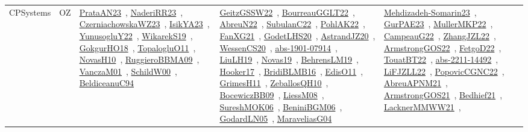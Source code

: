 {\begin{longtable}{lp{3cm}>{\raggedright\arraybackslash}p{6cm}>{\raggedright\arraybackslash}p{6cm}>{\raggedright\arraybackslash}p{8cm}}
CPSystems & OZ & \href{works/PrataAN23.pdf}{PrataAN23}~\cite{PrataAN23}, \href{works/NaderiRR23.pdf}{NaderiRR23}~\cite{NaderiRR23}, \href{works/CzerniachowskaWZ23.pdf}{CzerniachowskaWZ23}~\cite{CzerniachowskaWZ23}, \href{works/IsikYA23.pdf}{IsikYA23}~\cite{IsikYA23}, \href{works/YunusogluY22.pdf}{YunusogluY22}~\cite{YunusogluY22}, \href{works/WikarekS19.pdf}{WikarekS19}~\cite{WikarekS19}, \href{works/GokgurHO18.pdf}{GokgurHO18}~\cite{GokgurHO18}, \href{works/TopalogluO11.pdf}{TopalogluO11}~\cite{TopalogluO11}, \href{works/NovasH10.pdf}{NovasH10}~\cite{NovasH10}, \href{works/RuggieroBBMA09.pdf}{RuggieroBBMA09}~\cite{RuggieroBBMA09}, \href{works/VanczaM01.pdf}{VanczaM01}~\cite{VanczaM01}, \href{works/SchildW00.pdf}{SchildW00}~\cite{SchildW00}, \href{works/BeldiceanuC94.pdf}{BeldiceanuC94}~\cite{BeldiceanuC94} & \href{works/GeitzGSSW22.pdf}{GeitzGSSW22}~\cite{GeitzGSSW22}, \href{works/BourreauGGLT22.pdf}{BourreauGGLT22}~\cite{BourreauGGLT22}, \href{works/AbreuN22.pdf}{AbreuN22}~\cite{AbreuN22}, \href{works/SubulanC22.pdf}{SubulanC22}~\cite{SubulanC22}, \href{works/PohlAK22.pdf}{PohlAK22}~\cite{PohlAK22}, \href{works/FanXG21.pdf}{FanXG21}~\cite{FanXG21}, \href{works/GodetLHS20.pdf}{GodetLHS20}~\cite{GodetLHS20}, \href{works/AstrandJZ20.pdf}{AstrandJZ20}~\cite{AstrandJZ20}, \href{works/WessenCS20.pdf}{WessenCS20}~\cite{WessenCS20}, \href{works/abs-1901-07914.pdf}{abs-1901-07914}~\cite{abs-1901-07914}, \href{works/LiuLH19.pdf}{LiuLH19}~\cite{LiuLH19}, \href{works/Novas19.pdf}{Novas19}~\cite{Novas19}, \href{works/BehrensLM19.pdf}{BehrensLM19}~\cite{BehrensLM19}, \href{works/Hooker17.pdf}{Hooker17}~\cite{Hooker17}, \href{works/BridiBLMB16.pdf}{BridiBLMB16}~\cite{BridiBLMB16}, \href{works/EdisO11.pdf}{EdisO11}~\cite{EdisO11}, \href{works/GrimesH11.pdf}{GrimesH11}~\cite{GrimesH11}, \href{works/ZeballosQH10.pdf}{ZeballosQH10}~\cite{ZeballosQH10}, \href{works/BocewiczBB09.pdf}{BocewiczBB09}~\cite{BocewiczBB09}, \href{works/LiessM08.pdf}{LiessM08}~\cite{LiessM08}, \href{works/SureshMOK06.pdf}{SureshMOK06}~\cite{SureshMOK06}, \href{works/BeniniBGM06.pdf}{BeniniBGM06}~\cite{BeniniBGM06}, \href{works/GodardLN05.pdf}{GodardLN05}~\cite{GodardLN05}, \href{works/MaraveliasG04.pdf}{MaraveliasG04}~\cite{MaraveliasG04} & \href{works/Mehdizadeh-Somarin23.pdf}{Mehdizadeh-Somarin23}~\cite{Mehdizadeh-Somarin23}, \href{works/GurPAE23.pdf}{GurPAE23}~\cite{GurPAE23}, \href{works/MullerMKP22.pdf}{MullerMKP22}~\cite{MullerMKP22}, \href{works/CampeauG22.pdf}{CampeauG22}~\cite{CampeauG22}, \href{works/ZhangJZL22.pdf}{ZhangJZL22}~\cite{ZhangJZL22}, \href{works/ArmstrongGOS22.pdf}{ArmstrongGOS22}~\cite{ArmstrongGOS22}, \href{works/FetgoD22.pdf}{FetgoD22}~\cite{FetgoD22}, \href{works/TouatBT22.pdf}{TouatBT22}~\cite{TouatBT22}, \href{works/abs-2211-14492.pdf}{abs-2211-14492}~\cite{abs-2211-14492}, \href{works/LiFJZLL22.pdf}{LiFJZLL22}~\cite{LiFJZLL22}, \href{works/PopovicCGNC22.pdf}{PopovicCGNC22}~\cite{PopovicCGNC22}, \href{works/AbreuAPNM21.pdf}{AbreuAPNM21}~\cite{AbreuAPNM21}, \href{works/ArmstrongGOS21.pdf}{ArmstrongGOS21}~\cite{ArmstrongGOS21}, \href{works/Bedhief21.pdf}{Bedhief21}~\cite{Bedhief21}, \href{works/LacknerMMWW21.pdf}{LacknerMMWW21}~\cite{LacknerMMWW21}, 
\end{longtable}}
